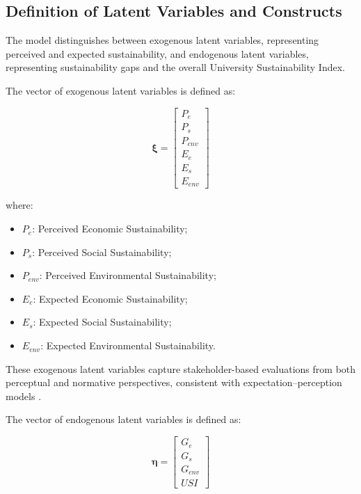 \documentclass[12pt,a4paper]{article}
\begin{document}
\subsection{Definition of Latent Variables and Constructs}

The model distinguishes between exogenous latent variables, representing perceived and expected sustainability, and endogenous latent variables, representing sustainability gaps and the overall University Sustainability Index.

The vector of exogenous latent variables is defined as:

\begin{equation}
\boldsymbol{\xi} =
\begin{bmatrix}
P_e \\
P_s \\
P_{env} \\
E_e \\
E_s \\
E_{env}
\end{bmatrix}
\label{eq:xi}
\end{equation}

where:

\begin{itemize}
\item $P_e$: Perceived Economic Sustainability;
\item $P_s$: Perceived Social Sustainability;
\item $P_{env}$: Perceived Environmental Sustainability;
\item $E_e$: Expected Economic Sustainability;
\item $E_s$: Expected Social Sustainability;
\item $E_{env}$: Expected Environmental Sustainability.
\end{itemize}

These exogenous latent variables capture stakeholder-based evaluations from both perceptual and normative perspectives, consistent with expectation–perception models \citep{Parasuraman1988}.

The vector of endogenous latent variables is defined as:

\begin{equation}
\boldsymbol{\eta} =
\begin{bmatrix}
G_e \\
G_s \\
G_{env} \\
USI
\end{bmatrix}
\label{eq:eta}
\end{equation}
\end{document}
